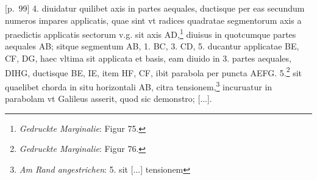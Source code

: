 [p.~99] 4. diuidatur quilibet axis in partes aequales, ductisque per eas secundum numeros impares applicatis, quae sint vt radices quadratae segmentorum axis a praedictis applicatis sectorum v.g. sit axis AD,\footnote{\textit{Gedruckte Marginalie}: Figur 75.} diuisus in quotcumque partes aequales AB; sitque segmentum AB, 1. BC, 3. CD, 5. ducantur applicatae BE, CF, DG, haec vltima sit applicata et basis, eam diuido in 3. partes aequales, DIHG, ductisque BE, IE, item HF, CF, ibit parabola per puncta AEFG. 5.\footnote{\textit{Gedruckte Marginalie}: Figur 76.} sit quaelibet chorda in situ horizontali AB, citra tensionem,\footnote{\textit{Am Rand angestrichen}: 5. sit [...] tensionem } incuruatur in parabolam vt Galileus\protect{} asserit, quod sic demonstro; [...].